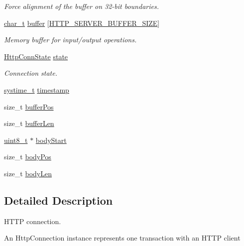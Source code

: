 \begin{DoxyCompactItemize}
\begin{DoxyCompactList}\small\item\em Force alignment of the buffer on 32-\/bit boundaries. \end{DoxyCompactList}\item 
\hyperlink{compiler__port_8h_a40bb5262bf908c328fbcfbe5d29d0201}{char\+\_\+t} \hyperlink{struct__HttpConnection_ac60f169d3523795b71f8082a35412acb}{buffer} \mbox{[}\hyperlink{http__server_8h_a7323ad0fee234d179bd1f679496174d2}{H\+T\+T\+P\+\_\+\+S\+E\+R\+V\+E\+R\+\_\+\+B\+U\+F\+F\+E\+R\+\_\+\+S\+I\+ZE}\mbox{]}
\begin{DoxyCompactList}\small\item\em Memory buffer for input/output operations. \end{DoxyCompactList}\item 
\hyperlink{http__server_8h_a8342e12cba584e291d33ff5767f2680e}{Http\+Conn\+State} \hyperlink{struct__HttpConnection_a489d1242b77a233572ff2d9d65661ccf}{state}
\begin{DoxyCompactList}\small\item\em Connection state. \end{DoxyCompactList}\item 
\hyperlink{compiler__port_8h_ae3e32a98d431a02106616da3071832dd}{systime\+\_\+t} \hyperlink{struct__HttpConnection_aec53535a46fe290578e39b9fae8cba46}{timestamp}
\item 
size\+\_\+t \hyperlink{struct__HttpConnection_ad23b22bb32213e63e03b7079e0cdbf03}{buffer\+Pos}
\item 
size\+\_\+t \hyperlink{struct__HttpConnection_a236795607df80bee3a6a1b50d49e821d}{buffer\+Len}
\item 
\hyperlink{stdint_8h_aba7bc1797add20fe3efdf37ced1182c5}{uint8\+\_\+t} $\ast$ \hyperlink{struct__HttpConnection_ae02d4e9d5e9da174004cc33fb342a9fa}{body\+Start}
\item 
size\+\_\+t \hyperlink{struct__HttpConnection_a1181140ed4ccd8b306f9e6520990655c}{body\+Pos}
\item 
size\+\_\+t \hyperlink{struct__HttpConnection_a86219c0e9a1a2f3723cd74139e548b32}{body\+Len}
\end{DoxyCompactItemize}


\subsection{Detailed Description}
H\+T\+TP connection. 

An Http\+Connection instance represents one transaction with an H\+T\+TP client 

